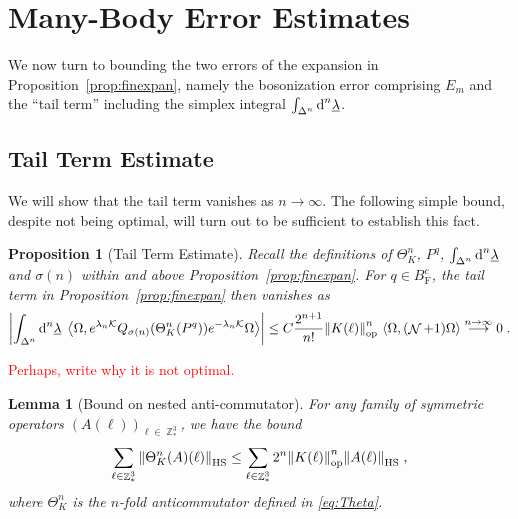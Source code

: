 \documentclass[12pt,a4paper]{article}
\numberwithin{equation}{section}
\newcommand{\cK}{\mathcal{K}}
\newcommand{\ulambda}{\underline{\lambda}}
\newcommand{\1}{\mathbb{I}}
\newcommand{\di}{\textnormal{d}}
\newcommand{\F}{\mathrm{F}}
\newcommand{\HS}{\mathrm{HS}}
\DeclareMathOperator{\Z}{\mathbb{Z}}
\DeclareMathOperator{\NN}{\mathcal{N}}
\newcommand{\eva}[1]{\left\langle #1 \right\rangle}
\theoremstyle{plain}
\newtheorem{lemma}[theorem]{Lemma}
\newtheorem{proposition}[theorem]{Proposition}
\theoremstyle{definition}
\theoremstyle{remark}
\theoremstyle{plain}
\theoremstyle{definition}
\theoremstyle{remark}
\begin{document}
\section{Many-Body Error Estimates}
\label{subsec:manybody_estimates}

We now turn to bounding the two errors of the expansion in Proposition~\ref{prop:finexpan}, namely the bosonization error comprising $ E_m $ and the ``tail term'' including the simplex integral $ \int_{\Delta^n} \di^n \ulambda $.


\subsection{Tail Term Estimate}
\label{subsec:tailestimate}

We will show that the tail term vanishes as $ n \to \infty $. The following simple bound, despite not being optimal, will turn out to be sufficient to establish this fact.

\begin{proposition}[Tail Term Estimate]\label{prop:headerr}
Recall the definitions of $ \Theta^n_K $, $ P^q $, $ \int_{\Delta^n} \di^n \ulambda $ and $ \sigma(n) $ within and above Proposition~\ref{prop:finexpan}. For $q \in B^c_{\F}$, the tail term in Proposition~\ref{prop:finexpan} then vanishes as
\begin{equation}\label{eq:headest}
    \abs{\int_{\Delta^n} \di^n\underline{\lambda} \;
		\eva{\Omega, e^{\lambda_n \cK}Q_{\sigma(n)}(\Theta^n_{K}(P^q)) e^{-\lambda_n \cK} \Omega} }
    \leq C \frac{2^{n+1}}{n!} \norm{K(\ell)}^n_{\mathrm{op}} \, \eva{\Omega,(\NN+1)\Omega} \overset{n \to \infty}{\longrightarrow} 0 \;.
\end{equation}
\end{proposition}
\textcolor{red}{Perhaps, write why it is not optimal.}

\begin{lemma}[Bound on nested anti-commutator]\label{lem:multicommest}
For any family of symmetric operators $ (A(\ell))_{\ell \in \Z^3_*} $, we have the bound
\begin{equation}
	\sum\limits_{\ell \in \Z^3_*}\norm{\Theta^{n}_K(A)(\ell)}_{\HS}
	\leq \sum\limits_{\ell \in \Z^3_*} 2^n \norm{K(\ell)}^{n}_{\mathrm{op}}\norm{A(\ell)}_{\HS} \;,
\end{equation}
where $\Theta^n_K$ is the $ n $-fold anticommutator defined in \eqref{eq:Theta}.
\end{lemma}
\end{document}
